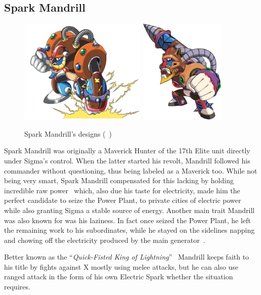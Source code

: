 \subsection{Spark Mandrill}\label{boss:Spark_mandrill}
\begin{figure}[htp]
	\centering
	\includegraphics[height=5cm]{figures/X1/Spark_mandrill/SparkMandrill.jpg}
	\includegraphics[height=5cm]{figures/X1/Spark_mandrill/MHXSparkMandrill.png}
	\caption{Spark Mandrill's designs (~\cite{book:MMX_Complete_art})}
\end{figure}
Spark Mandrill was originally a Maverick Hunter of the 17th Elite unit directly under Sigma's control. When the latter started his revolt, Mandrill followed his commander without questioning, thus being labeled as a Maverick too. While not being very smart, Spark Mandrill compensated for this lacking by holding incredible raw power~\cite{MHX:manual} which, also due his taste for electricity, made him the perfect candidate to seize the Power Plant, to private cities of electric power while also granting Sigma a stable source of energy. Another main trait Mandrill was also known for was his laziness. In fact once seized the Power Plant, he left the remaining work to his subordinates, while he stayed on the sidelines napping and chowing off the electricity produced by the main generator~\cite{wayback:X_resources}.



Better known as the ``\textit{Quick-Fisted King of Lightning}''~\cite{book:MMX_Complete_art} Mandrill keeps faith to his title by fights against X mostly using melee attacks, but he can also use ranged attack in the form of his own Electric Spark whether the situation requires.

